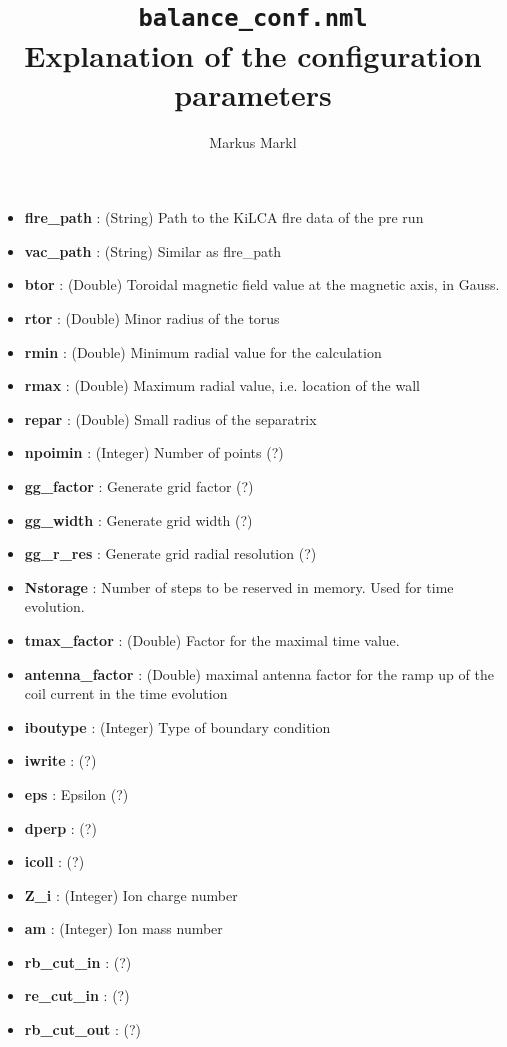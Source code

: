 \documentclass{article}
\title{\Huge \texttt{balance\_conf.nml} \\ \Large Explanation of the configuration parameters}
\author{Markus Markl}
\begin{document}
\maketitle

\begin{itemize}
	\item \textbf{flre\_path} : (String) Path to the KiLCA flre data of the pre run
	\item \textbf{vac\_path} : (String) Similar as flre\_path
	\item \textbf{btor} : (Double) Toroidal magnetic field value at the magnetic axis, in Gauss. 
	\item \textbf{rtor} : (Double) Minor radius of the torus
	\item \textbf{rmin} : (Double) Minimum radial value for the calculation
	\item \textbf{rmax} : (Double) Maximum radial value, i.e. location of the wall
	\item \textbf{repar} : (Double) Small radius of the separatrix
	\item \textbf{npoimin} : (Integer) Number of points (?)
	\item \textbf{gg\_factor} : Generate grid factor (?)
	\item \textbf{gg\_width} : Generate grid width (?)
	\item \textbf{gg\_r\_res} : Generate grid radial resolution (?)
	\item \textbf{Nstorage} : Number of steps to be reserved in memory. Used for time evolution.
	\item \textbf{tmax\_factor} : (Double) Factor for the maximal time value.
	\item \textbf{antenna\_factor} : (Double) maximal antenna factor for the ramp up of the coil current in the time evolution
	\item \textbf{iboutype} : (Integer) Type of boundary condition
	\item \textbf{iwrite} : (?)
	\item \textbf{eps} : Epsilon (?)
	\item \textbf{dperp} : (?)
	\item \textbf{icoll} : (?)
	\item \textbf{Z\_i} : (Integer) Ion charge number
	\item \textbf{am} : (Integer) Ion mass number
	\item \textbf{rb\_cut\_in} : (?)
	\item \textbf{re\_cut\_in} : (?)
	\item \textbf{rb\_cut\_out} : (?)

\end{itemize}
\end{document}
